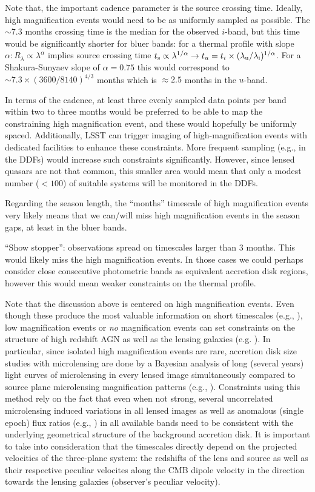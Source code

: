 Note that, the important cadence parameter is the source crossing time. Ideally,
high magnification events would need to be as uniformly sampled as possible. The
$\sim 7.3$ months crossing time is the median for the observed $i$-band, but this time
would be significantly shorter for bluer bands: for a thermal profile with slope
$\alpha: R_\lambda \propto \lambda^\alpha$ implies source crossing time $t_{\rm
s} \propto \lambda^{1/\alpha} \rightarrow t_u=t_i \times (\lambda_{\rm u} /
\lambda_{\rm i})^{1/\alpha}$. For a Shakura-Sunyaev slope of $\alpha=0.75$ this
would correspond to $\sim 7.3 \times (3600/8140)^{4/3}$ months which is $\approx 2.5$
months in the $u$-band.

In terms of the cadence, at least three evenly sampled data points per band
within two to three months would be preferred to be able to map the constraining
high magnification event, and these would hopefully be uniformly spaced.
Additionally, LSST can trigger imaging of high-magnification events with dedicated
facilities to enhance these constraints. More frequent sampling (e.g., in the DDFs)
would increase such constraints significantly. However, since lensed quasars are not
that common, this smaller area would mean that only a modest number ($<100$)
of suitable systems will be monitored in the DDFs.

Regarding the season length, the ``months'' timescale of high
magnification events very likely means that we can/will miss high
magnification events in the season gaps, at least in the bluer bands.

``Show stopper'': observations spread on timescales larger than 3 months.
This would likely miss the high magnification events. In those cases
we could perhaps consider close consecutive photometric bands as
equivalent accretion disk regions, however this would mean weaker
constraints on the thermal profile.

Note that the discussion above is centered on high magnification events. Even
though these produce the most valuable information on short timescales (e.g., \citealt{Anguita2008, eigenbrod2008}), low magnification events or
\emph{no} magnification events can set constraints on the structure of high
redshift AGN as well as the lensing galaxies (e.g. \citealt{gilmerino2005}). In particular, since isolated high magnification events are rare, accretion disk size studies with microlensing are done by a Bayesian analysis of long (several years) light curves of microlensing in every lensed image simultaneously compared to source plane microlensing magnification patterns (e.g., \citealt{kochanek2004,blackburne2014}). Constraints using this method rely on the fact that even when not strong, several uncorrelated microlensing induced variations in all lensed images as well as anomalous (single epoch) flux ratios (e.g., \citealt{bate2008,rojas2014}) in all available bands need to be consistent with the underlying geometrical structure of the background accretion disk. It is important to take into consideration that the timescales directly depend on the projected velocities of the three-plane system: the redshifts of the lens
and source as well as their respective peculiar velocites along the CMB dipole velocity in the direction towards the lensing galaxies (observer's peculiar velocity).

